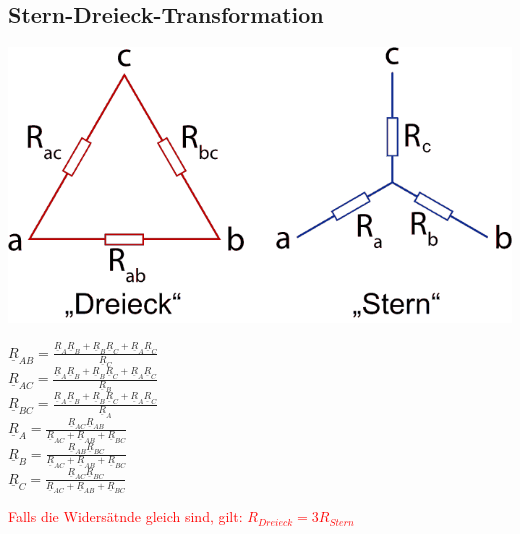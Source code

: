 \documentclass[a4paper, 6pt, landscape]{scrartcl}
\begin{document}
\begin{multicols*}{4}
  \subsection{Stern-Dreieck-Transformation}
  \begin{center}
      \includegraphics[scale=0.13]{source/Stern-Dreieck-Transformation.png}
  \end{center}
    \vspace{-0.3cm}
    \begin{multicols*}{2}
      $\underline{R}_{AB}=\frac{\underline{R}_{A}\underline{R}_{B}+\underline{R}_{B}\underline{R}_{C}+\underline{R}_{A}\underline{R}_{C}}{\underline{R}_{C}}$\\
      $\underline{R}_{AC}=\frac{\underline{R}_{A}\underline{R}_{B}+\underline{R}_{B}\underline{R}_{C}+\underline{R}_{A}\underline{R}_{C}}{\underline{R}_{B}}$\\
      $\underline{R}_{BC}=\frac{\underline{R}_{A}\underline{R}_{B}+\underline{R}_{B}\underline{R}_{C}+\underline{R}_{A}\underline{R}_{C}}{\underline{R}_{A}}$\\
      $\underline{R}_A=\frac{\underline{R}_{AC}\underline{R}_{AB}}{\underline{R}_{AC}+\underline{R}_{AB}+\underline{R}_{BC}}$\\
      $\underline{R}_B=\frac{\underline{R}_{AB}\underline{R}_{BC}}{\underline{R}_{AC}+\underline{R}_{AB}+\underline{R}_{BC}}$\\
      $\underline{R}_C=\frac{\underline{R}_{AC}\underline{R}_{BC}}{\underline{R}_{AC}+\underline{R}_{AB}+\underline{R}_{BC}}$
    \end{multicols*}
    \vspace{-0.4cm}
    \textcolor{red}{Falls die Widersätnde gleich sind, gilt: $R_{Dreieck}=3R_{Stern}$}\\
    \vspace{-0.3cm}


\end{multicols*}
\end{document}
